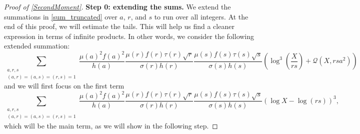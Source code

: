 \documentclass[10pt,a4paper]{amsart}
\def\CalQ{{\mathcal{Q}}}
\theoremstyle{plain}
\theoremstyle{definition}
\theoremstyle{remark}
\begin{document}
\begin{proof}[Proof of \cref{SecondMoment}]
\textbf{Step 0: extending the sums.} 
We extend the summations in \eqref{sum_truncated} over $a$, $r$, and $s$ to run over all integers. At the end of this proof, we will estimate the tails. This will help us find a cleaner expression in terms of infinite products. In other words, we consider the following extended summation:
\begin{equation} \label{eq:extended_sum}
\sum_{\substack{a,r,s \\
(a,r)=(a,s)=(r,s)=1}}
\frac{\mu(a)^2f(a)^2}{h(a)}\frac{\mu(r)f(r)\tau(r)\sqrt{r}}{\sigma(r)h(r)}\frac{\mu(s)f(s)\tau(s)\sqrt{s}}{\sigma(s)h(s)} \left(\log^3\left(\frac{X}{rs}\right)+\CalQ(X,rsa^2)\right)
\end{equation}
and we will first focus on the first term
\begin{equation}\label{last_sum}
\sum_{\substack{a,r,s\\(a,r)=(a,s)=(r,s)=1}}
\frac{\mu(a)^2f(a)^2}{h(a)}\frac{\mu(r)f(r)\tau(r)\sqrt{r}}{\sigma(r)h(r)}\frac{\mu(s)f(s)\tau(s)\sqrt{s}}{\sigma(s)h(s)}\left(\log X-\log(rs)\right)^3,
\end{equation}
which will be the main term, as we will show in the following step.


\end{proof}
\end{document}
